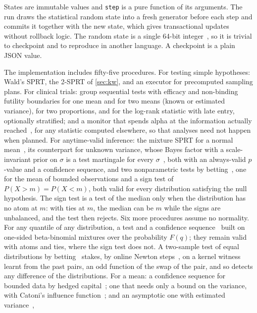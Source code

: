 \documentclass[11pt,a4paper]{article}
\theoremstyle{definition}
\theoremstyle{remark}
\newcommand{\code}[1]{\texttt{#1}}
\begin{document}
States are immutable values and \code{step} is a pure function of its
arguments. The run draws the statistical random state into a fresh
generator before each step and commits it together with the new state,
which gives transactional updates without rollback logic. The random
state is a single 64-bit integer~\cite{steele2014}, so it is trivial to
checkpoint and to reproduce in another language. A checkpoint is a
plain JSON value.

The implementation includes fifty-five procedures. For testing simple
hypotheses: Wald's SPRT, the 2-SPRT of \cref{sec:kw}, and an executor for
precomputed sampling plans. For clinical trials: group sequential
tests with efficacy and non-binding futility boundaries for one mean and
for two means (known or estimated variance), for two proportions, and
for the log-rank statistic with late entry, optionally stratified; and a
monitor that spends alpha at the information actually
reached~\cite{lan1983}, for any statistic computed elsewhere, so that
analyses need not happen when planned. For anytime-valid inference: the mixture SPRT for a
normal mean~\cite{robbins1970,johari2022}, its counterpart for unknown
variance, whose Bayes factor with a scale-invariant prior on $\sigma$ is
a test martingale for every $\sigma$~\cite{lai1976,perezortiz2024}, both
with an always-valid $p$-value and a confidence sequence, and two
nonparametric
tests by betting~\cite{shafer2021,waudbysmith2024,ramdas2023}, one for the
mean of bounded observations and a sign test of
$P(X>m)=P(X<m)$, both valid for every distribution satisfying the null
hypothesis. The sign test is a test of the median only when the
distribution has no atom at $m$: with ties at $m$, the median can be
$m$ while the signs are unbalanced, and the test then rejects. Six more
procedures assume no normality. For any quantile of any distribution, a
test and a confidence sequence~\cite{howard2022} built on one-sided
beta-binomial mixtures over the probability $F(q)$; they remain valid with
atoms and ties, where the sign test does not. A two-sample test of equal
distributions by betting~\cite{shekhar2024} stakes, by online Newton
steps~\cite{cutkosky2018}, on a kernel witness learnt from the past pairs,
an odd function of the swap of the pair, and so detects any difference of
the distributions. For a mean: a confidence sequence for bounded data by
hedged capital~\cite{waudbysmith2024}; one that needs only a bound on the
variance, with Catoni's influence function~\cite{catoni2012,wang2023}; and
an asymptotic one with estimated variance~\cite{waudbysmith2024asymptotic},
\end{document}
